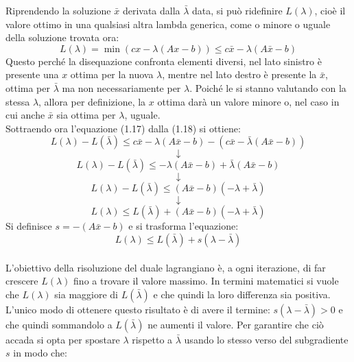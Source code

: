 \documentclass[12pt,a4paper,twoside]{report}
\begin{document}
	Riprendendo la soluzione $\bar{x}$ derivata dalla $\bar{\lambda}$ data, si può ridefinire $L(\lambda)$, cioè il valore ottimo in una qualsiasi altra lambda generica, come o minore o uguale della soluzione trovata ora:
	\begin{equation}
		L(\lambda)=\min (cx-\lambda(Ax-b))\leq c\bar{x}-\lambda(A\bar{x}-b)
	\end{equation}
	Questo perché la disequazione confronta elementi diversi, nel lato sinistro è presente una $x$ ottima per la nuova $\lambda$, mentre nel lato destro è presente la $\bar{x}$, ottima per $\bar{\lambda}$ ma non necessariamente per $\lambda$. Poiché le si stanno valutando con la stessa $\lambda$, allora per definizione, la $x$ ottima darà un valore minore o, nel caso in cui anche $\bar{x}$ sia ottima per $\lambda$, uguale.\smallskip \\
	Sottraendo ora l'equazione (1.17) dalla (1.18) si ottiene:
	\begin{equation}
		L(\lambda)-L(\bar{\lambda})\leq c\bar{x}-\lambda(A\bar{x}-b)-(c\bar{x}-\bar{\lambda}(A\bar{x}-b))
	\end{equation}
	$$\downarrow$$
	\begin{equation}
		L(\lambda)-L(\bar{\lambda})\leq -\lambda(A\bar{x}-b)+\bar{\lambda}(A\bar{x}-b)
	\end{equation}
	$$\downarrow$$
	\begin{equation}
		L(\lambda)-L(\bar{\lambda})\leq (A\bar{x}-b)(-\lambda+\bar{\lambda})
	\end{equation}
	$$\downarrow$$
	\begin{equation}
		L(\lambda)\leq L(\bar{\lambda})+(A\bar{x}-b)(-\lambda+\bar{\lambda})
	\end{equation}
	Si definisce $s=-(A\bar{x}-b)$ e si trasforma l'equazione: \\
	\begin{equation}
		L(\lambda)\leq L(\bar{\lambda})+s(\lambda-\bar{\lambda})
	\end{equation}
	\smallskip \\
	L'obiettivo della risoluzione del duale lagrangiano è, a ogni iterazione, di far crescere $L(\lambda)$ fino a trovare il valore massimo.
	In termini matematici si vuole che $L(\lambda)$ sia maggiore di $L(\bar{\lambda})$ e che quindi la loro differenza sia positiva.
	L'unico modo di ottenere questo risultato è di avere il termine: $s(\lambda-\bar{\lambda})>0$ e che quindi sommandolo a $L(\bar{\lambda})$ ne aumenti il valore. Per garantire che ciò accada si opta per spostare $\lambda$ rispetto a $\bar{\lambda}$ usando lo stesso verso del subgradiente $s$ in modo che:
\end{document}

